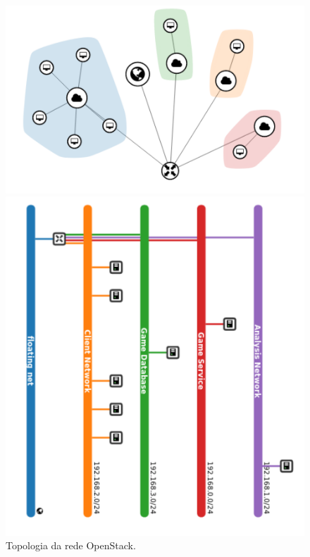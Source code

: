 \begin{figure}[htb!]
    \begin{minipage}[c]{0.5\linewidth}
        \centering
        \includegraphics[width=\textwidth]{img/cap5/topology_graph.png}
       
    \end{minipage}
    \begin{minipage}[c]{0.45\linewidth}
        \centering
         \caption{Topologia da rede OpenStack.}
        \includegraphics[width=\textwidth]{img/cap5/topology.png}
       
      
    \end{minipage}
      \label{fig:topologia}
\end{figure}

